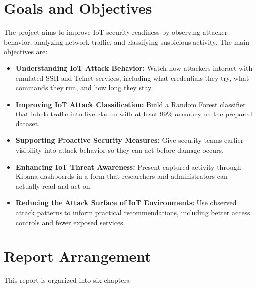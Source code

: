 \section{Goals and Objectives}
\label{sec:goals_and_objectives}

The project aims to improve IoT security readiness by observing attacker behavior, analyzing network traffic, and classifying suspicious activity. The main objectives are:

\begin{itemize}
\item \textbf{Understanding IoT Attack Behavior:} Watch how attackers interact with emulated SSH and Telnet services, including what credentials they try, what commands they run, and how long they stay.
\item \textbf{Improving IoT Attack Classification:} Build a Random Forest classifier that labels traffic into five classes with at least 99\% accuracy on the prepared dataset.
\item \textbf{Supporting Proactive Security Measures:} Give security teams earlier visibility into attack behavior so they can act before damage occurs.
\item \textbf{Enhancing IoT Threat Awareness:} Present captured activity through Kibana dashboards in a form that researchers and administrators can actually read and act on.
\item \textbf{Reducing the Attack Surface of IoT Environments:} Use observed attack patterns to inform practical recommendations, including better access controls and fewer exposed services.
\end{itemize}

\section{Report Arrangement}
\label{sec:report_arrangement}

This report is organized into six chapters:

